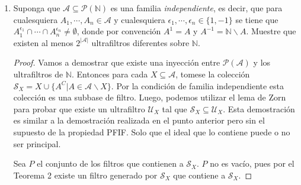 \documentclass[letter,twoside,12pt]{article}
\begin{document}
\begin{enumerate}
\begin{proof}
Por ultimo, $ M $ es un PFIF también, porque si no lo fuera entonces existirian 2 (porque $ M $ es cerrado bajo intersecciones) elementos , $ A $ y $ B \in M$ tales que $ A \cap B $ es finito. Pero de nuevo existirian filtros $ F_1 $ y $ F_2 \in T$  tales que $ A \in F_1 $ y $ B \in F_2 $, si suponemos sin pérdida de generalidad que $ F_1 \subseteq F_2 $ entonces tendriamos que $A \in F_2$ por lo que $ F_2 $ no sería un PFIF. Contradicción. Por ultimo es cota porque para cualquier $ F \in T $, $ F \subseteq M $. Luego, podemos utilizar el Lema de Zorn para concluir que existe un filtro máximal $ \mathcal{U} $ tal que contiene A $ \mathcal{A} $ y es PFIF, pero por el Teorema 5 tenemos que $ \mathcal{U} $ sería un ultrafiltro PFIF, que por lo tanto es no principal, pues si lo fuera entonces $ \{x\} \in \mathcal{U}\ $ y no podría ser PFIF.
\end{proof}

\item Suponga que $ \mathcal{A} \subseteq \mathcal{P}(\mathbb{N}) $ es una familia \textit{independiente}, es decir, que para cualesquiera $ A_1, \cdots, A_n \in \mathcal{A} $ y cualesquiera $ \epsilon_1, \cdots, \epsilon_n \in \{1,-1\} $ se tiene que $ A_1^{\epsilon_1} \cap \cdots \cap A_n^{\epsilon_n} \not = \emptyset $, donde por convención $ A^1 = A $ y $ A^{-1}= \mathbb{N}\backslash A $. Muestre que existen al menos $ 2^{|\mathcal{A}|} $ ultrafiltros diferentes sobre $ \mathbb{N} $.
\begin{proof}

Vamos a demostrar que existe una inyección entre $ \mathcal{P}(\mathcal{A}) $ y los ultrafiltros de $ \mathbb{N} $. Entonces para cada $ X \subseteq \mathcal{A} $, tomese la colección $ \mathcal{S}_X = X \cup \{A^C|A \in \mathcal{A}\backslash X\}$. Por la condición de familia independiente esta colección es una subbase de filtro. Luego, podemos utilizar el lema de Zorn para probar que existe un ultrafiltro $ \mathcal{U}_X $ tal que $ \mathcal{S}_X \subseteq \mathcal{U}_X$. Esta demostración es similar a la demostración realizada en el punto anterior pero sin el supuesto de la propiedad PFIF. Solo que el ideal que lo contiene puede o no ser principal.

Sea $ P $ el conjunto de los filtros que contienen a $ \mathcal{S}_X $. $ P $ no es vacío, pues por el Teorema 2 existe un filtro generado por $ \mathcal{S}_X $ que contiene a $ \mathcal{S}_X $.


\end{proof}
\end{enumerate}
\end{document}
